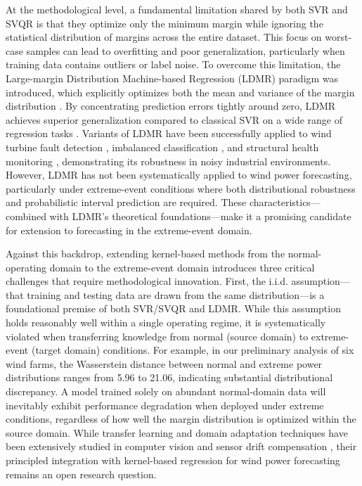 \documentclass[a4paper]{cas-sc}
\begin{document}
At the methodological level, a fundamental limitation shared by both SVR and SVQR is that they optimize only the minimum margin while ignoring the statistical distribution of margins across the entire dataset. This focus on worst-case samples can lead to overfitting and poor generalization, particularly when training data contains outliers or label noise. To overcome this limitation, the Large-margin Distribution Machine-based Regression (LDMR) paradigm was introduced, which explicitly optimizes both the mean and variance of the margin distribution \citep{zhang2019optimal, gupta2021least}. By concentrating prediction errors tightly around zero, LDMR achieves superior generalization compared to classical SVR on a wide range of regression tasks \citep{gupta2021least, hazarika2023mode}. Variants of LDMR have been successfully applied to wind turbine fault detection \citep{tang2019cost}, imbalanced classification \citep{CHENG2016107}, and structural health monitoring \citep{doi:10.1177/14759217231159948}, demonstrating its robustness in noisy industrial environments. However, LDMR has not been systematically applied to wind power forecasting, particularly under extreme-event conditions where both distributional robustness and probabilistic interval prediction are required. These characteristics---combined with LDMR's theoretical foundations---make it a promising candidate for extension to forecasting in the extreme-event domain.

Against this backdrop, extending kernel-based methods from the normal-operating domain to the extreme-event domain introduces three critical challenges that require methodological innovation. First, the i.i.d. assumption---that training and testing data are drawn from the same distribution---is a foundational premise of both SVR/SVQR and LDMR. While this assumption holds reasonably well within a single operating regime, it is systematically violated when transferring knowledge from normal (source domain) to extreme-event (target domain) conditions. For example, in our preliminary analysis of six wind farms, the Wasserstein distance between normal and extreme power distributions ranges from 5.96 to 21.06, indicating substantial distributional discrepancy. A model trained solely on abundant normal-domain data will inevitably exhibit performance degradation when deployed under extreme conditions, regardless of how well the margin distribution is optimized within the source domain. While transfer learning and domain adaptation techniques have been extensively studied in computer vision \citep{TAO20123962} and sensor drift compensation \citep{YAN2022107664, GUO2022118237, dp2, ss2}, their principled integration with kernel-based regression for wind power forecasting remains an open research question.
\end{document}
